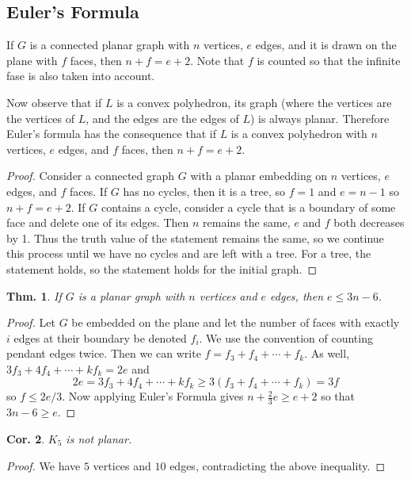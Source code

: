\documentclass[12pt, a4paper]{book}
\newtheorem{theorem}{Thm.}[section]
\newtheorem{corollary}[theorem]{Cor.}
\theoremstyle{nonumberplain}
\newtheorem{proof}{Proof}
\begin{document}
\subsection{Euler's Formula}
If $G$ is a connected planar graph with $n$ vertices, $e$ edges, and it is drawn on the plane with $f$ faces, then $n+f=e+2$.
Note that $f$ is counted so that the infinite fase is also taken into account.

Now observe that if $L$ is a convex polyhedron, its graph (where the vertices are the vertices of $L$, and the edges are the edges of $L$) is always planar.
Therefore Euler's formula has the consequence that if $L$ is a convex polyhedron with $n$ vertices, $e$ edges, and $f$ faces, then $n+f=e+2$.
\begin{proof}
    Consider a connected graph $G$ with a planar embedding on $n$ vertices, $e$ edges, and $f$ faces.
    If $G$ has no cycles, then it is a tree, so $f=1$ and $e=n-1$ so $n+f=e+2$.
    If $G$ contains a cycle, consider a cycle that is a boundary of some face and delete one of its edges.
    Then $n$ remains the same, $e$ and $f$ both decreases by 1.
    Thus the truth value of the statement remains the same, so we continue this process until we have no cycles and are left with a tree.
    For a tree, the statement holds, so the statement holds for the initial graph.
\end{proof}
\begin{theorem}
    If $G$ is a planar graph with $n$ vertices and $e$ edges, then $e\leq 3n-6$.
\end{theorem}
\begin{proof}
    Let $G$ be embedded on the plane and let the number of faces with exactly $i$ edges at their boundary be denoted $f_i$.
    We use the convention of counting pendant edges twice.
    Then we can write $f=f_3+f_4+\cdots+f_k$.
    As well, $3f_3+4f_4+\cdots+kf_k=2e$ and
    \begin{equation*}
        2e = 3f_3+4f_4+\cdots+kf_k\geq 3(f_3+f_4+\cdots+f_k)=3f
    \end{equation*}
    so $f\leq 2e/3$.
    Now applying Euler's Formula gives $n+\frac{2}{3}e\geq e+2$ so that $3n-6\geq e$.
\end{proof}
\begin{corollary}
    $K_5$ is not planar.
\end{corollary}
\begin{proof}
    We have $5$ vertices and $10$ edges, contradicting the above inequality.
\end{proof}
\end{document}
